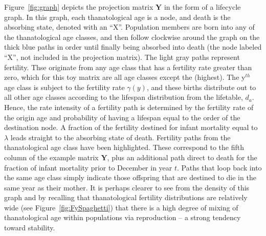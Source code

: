 \documentclass{article}
\begin{document}
Figure~\ref{fig:graph} depicts the projection matrix $\textbf{Y}$ in the form of
a lifecycle graph.  In this graph, each thanatological age is a node, and death
is the absorbing state, denoted with an ``X''.
Population members are born into any of the thanatological age classes, and then follow
clockwise around the graph on the thick blue paths in order until finally being
absorbed into death (the node labeled ``X'', not included in the projection matrix). The light gray paths represent fertility. Thse originate from any age class that has a fertility rate greater
than zero, which for this toy matrix are all age classes except the 
(highest). The y$^{th}$ age class is subject to the fertility rate $\gamma
(y)$, and these births distribute out to all other age classes according to the
lifespan distribution from the lifetable, $d_a$. Hence, the rate intensity of a
fertility path is determined by the fertility rate of the origin age and
probability of having a lifespan equal to the order of the destination node.  A fraction of
the fertility destined for infant mortality equal to $\lambda$ leads straight to the absorbing state of death. Fertility paths from the  thanatological age class have been highlighted. These correspond to the fifth column of the example matrix $\textbf{Y}$, plus an additional path
direct to death for the fraction of infant mortality prior to December 
in year $t$. Paths that loop back into the same age class simply indicate those
offspring that are destined to die in the same year as their mother. It is
perhaps clearer to see from the density of this graph and by recalling that
thanatological fertility distributions are relatively wide (see
Figure~\ref{fig:FySpaghetti}) that there is a high degree of mixing of
thanatological age within populations via reproduction -- a strong tendency
toward stability.
\end{document}
